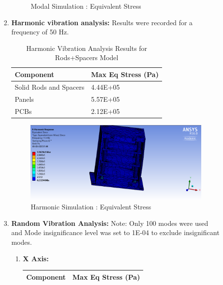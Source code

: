 \documentclass[../../main.tex]{subfiles}
\begin{document}
\begin{enumerate}
\begin{enumerate}
\begin{enumerate}
\begin{figure}[H]
        \caption{Modal Simulation : Equivalent Stress}
        \label{fig:sys_CAD}
    \end{figure}
            \item \textbf{Harmonic vibration analysis:} Results were recorded for a frequency of 50 Hz.
                \begin{table}[h!]
                    \centering
                    \begin{tabular}{|p{8cm}|p{3cm}|}
                        \hline
                        \textbf{Component} & \textbf{Max Eq Stress (Pa)} \\
                        \hline
                       
                        Solid Rods and Spacers & 4.44E+05 \\
                        \hline
                        Panels & 5.57E+05 \\
                        \hline
                        PCBs  & 2.12E+05 \\
                        \hline
                    \end{tabular}
                    \caption{Harmonic Vibration Analysis Results for Rods+Spacers Model}
                    \label{tab:my_label}
                \end{table}
                \begin{figure}[H]
        \centering
        \includegraphics[scale=0.5]{Figures/Mechanical/harmonic.png}
        \caption{Harmonic Simulation : Equivalent Stress}
        \label{fig:sys_CAD}
    \end{figure}
    \newpage
        \item \textbf{Random Vibration Analysis: } Note: Only 100 modes were used and Mode insignificance level was set to 1E-04 to exclude insignificant modes.
                \begin{enumerate}
                    \item \textbf{X Axis: }
                    \begin{table}[h!]
                    \centering
                    \begin{tabular}{|p{8cm}|p{3cm}|}
                        \hline
                        \textbf{Component} & \textbf{Max Eq Stress (Pa)} \\
                        \hline
                       

\end{tabular}
\end{table}
\end{enumerate}
\end{enumerate}
\end{enumerate}
\end{enumerate}
\end{document}
